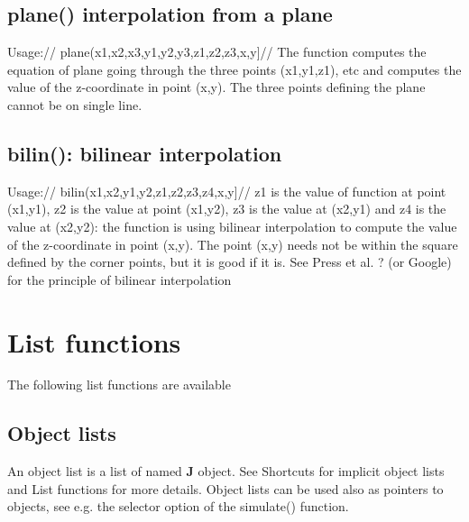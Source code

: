 \begin{itemize}
\subsection{\textcolor{VioletRed}{plane}() interpolation from a plane}
\label{plane}
Usage://
\textcolor{VioletRed}{plane}(x1,x2,x3,y1,y2,y3,z1,z2,z3,x,y]//
The function computes the equation of plane going through the three points (x1,y1,z1), etc
and computes the value of the z-coordinate in point (x,y). The three points defining the plane
cannot be on single line.
\subsection{\textcolor{VioletRed}{bilin}(): bilinear interpolation}
\label{bilin}
Usage://
\textcolor{VioletRed}{bilin}(x1,x2,y1,y2,z1,z2,z3,z4,x,y]//
z1 is the value of function at point (x1,y1), z2 is the value at point (x1,y2), z3 is the value at
(x2,y1) and z4 is the value at (x2,y2): the function is using bilinear interpolation to compute
the value of the z-coordinate in point (x,y). The point (x,y) needs not be within the square
defined by the corner points, but it is good if it is. See Press et al. ? (or Google) for the principle
of bilinear interpolation
\section{List functions}
\label{lists}
The following list functions are available
\subsection{Object lists}
\label{listo}
An object list is a list of named \textbf{J} object. See Shortcuts for implicit object
lists and List functions for more details. Object lists can be used also as
pointers to objects, see e.g. the selector option of the simulate() function.

\end{itemize}
